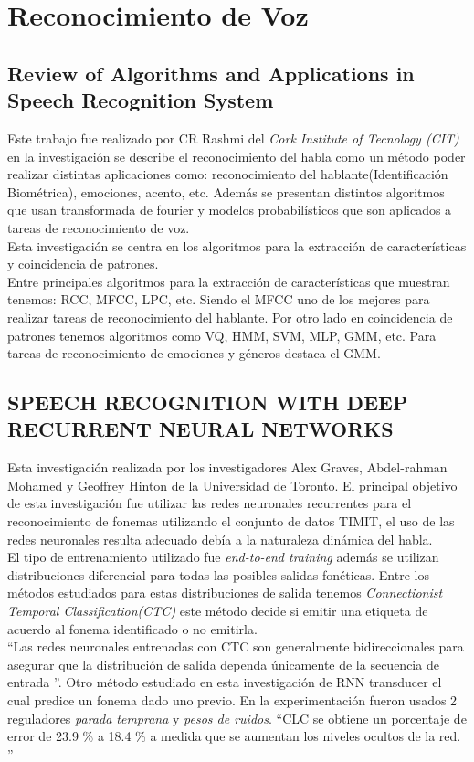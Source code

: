 \section{Reconocimiento de Voz}
\subsection{Review of Algorithms and Applications in Speech Recognition System}
Este trabajo fue realizado por CR Rashmi del \textit{ Cork Institute of Tecnology (CIT) } en la investigación se describe el reconocimiento del habla como un método poder realizar distintas aplicaciones como: reconocimiento del hablante(Identificación Biométrica), emociones, acento, etc. Además se presentan distintos algoritmos que usan transformada de fourier y modelos probabilísticos que son aplicados a tareas de reconocimiento de voz.\\ Esta investigación se centra en los algoritmos para la extracción de características y coincidencia de patrones.\\ Entre principales algoritmos para la extracción de características que muestran tenemos: RCC, MFCC, LPC, etc. Siendo el MFCC uno de los mejores para realizar tareas de reconocimiento del hablante. Por otro lado en coincidencia de patrones tenemos algoritmos como VQ, HMM, SVM, MLP, GMM, etc. Para tareas de reconocimiento de emociones y géneros destaca el GMM.
\subsection{SPEECH RECOGNITION WITH DEEP RECURRENT NEURAL NETWORKS}
Esta investigación realizada por los investigadores Alex Graves, Abdel-rahman Mohamed y Geoffrey Hinton de la Universidad de Toronto. El principal objetivo de esta investigación fue utilizar las redes neuronales recurrentes para el reconocimiento de fonemas utilizando el conjunto de datos TIMIT, el uso de las redes neuronales resulta adecuado debía a la naturaleza dinámica del habla.\\ El tipo de entrenamiento utilizado fue \textit{ end-to-end training} además se utilizan distribuciones diferencial para todas las posibles salidas fonéticas. Entre los métodos estudiados para estas distribuciones de salida tenemos \textit{Connectionist Temporal Classification(CTC)} este método decide si emitir una etiqueta de acuerdo al fonema identificado o no emitirla.\\  \textquotedblleft Las redes neuronales entrenadas con CTC son generalmente bidireccionales para asegurar que la distribución de salida dependa únicamente de la secuencia de entrada \textquotedblright. Otro método estudiado en esta investigación de RNN transducer el cual predice un fonema dado uno previo. En la experimentación fueron usados 2 reguladores \textit{parada temprana} y \textit{pesos de ruidos}. \textquotedblleft CLC se obtiene un porcentaje de error de 23.9 \% a 18.4 \% a medida que se aumentan los niveles ocultos de la red. \textquotedblright

